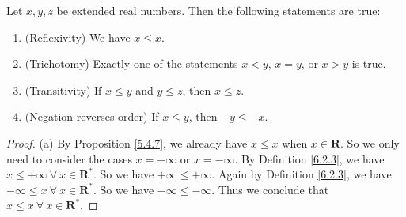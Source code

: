 \setcounter{theorem}{4}
\begin{proposition}\label{6.2.5}
    Let \(x, y, z\) be extended real numbers.
    Then the following statements are true:
    \begin{enumerate}
        \item (Reflexivity)
              We have \(x \leq x\).
        \item (Trichotomy)
              Exactly one of the statements \(x < y\), \(x = y\), or \(x > y\) is true.
        \item (Transitivity)
              If \(x \leq y\) and \(y \leq z\), then \(x \leq z\).
        \item (Negation reverses order) If \(x \leq y\), then \(-y \leq -x\).
    \end{enumerate}
\end{proposition}

\begin{proof}{(a)}
    By Proposition \ref{5.4.7}, we already have \(x \leq x\) when \(x \in \mathbf{R}\).
    So we only need to consider the cases \(x = +\infty\) or \(x = -\infty\).
    By Definition \ref{6.2.3}, we have \(x \leq +\infty \ \forall\ x \in \mathbf{R}^*\).
    So we have \(+\infty \leq +\infty\).
    Again by Definition \ref{6.2.3}, we have \(-\infty \leq x \ \forall\ x \in \mathbf{R}^*\).
    So we have \(-\infty \leq -\infty\).
    Thus we conclude that \(x \leq x \ \forall\ x \in \mathbf{R}^*\).
\end{proof}

